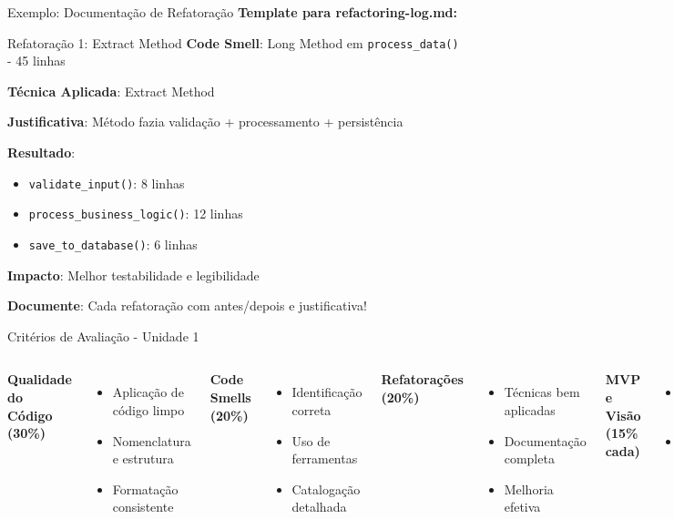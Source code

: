 \documentclass[10pt]{beamer}
\begin{document}
\begin{frame}[fragile]{Exemplo: Documentação de Refatoração}
\textbf{Template para refactoring-log.md:}

\begin{block}{Refatoração 1: Extract Method}
\textbf{Code Smell}: Long Method em \texttt{process\_data()} - 45 linhas

\textbf{Técnica Aplicada}: Extract Method

\textbf{Justificativa}: Método fazia validação + processamento + persistência

\textbf{Resultado}: 
\begin{itemize}
    \item \texttt{validate\_input()}: 8 linhas
    \item \texttt{process\_business\_logic()}: 12 linhas  
    \item \texttt{save\_to\_database()}: 6 linhas
\end{itemize}

\textbf{Impacto}: Melhor testabilidade e legibilidade
\end{block}

\vspace{0.2cm}
\textbf{Documente}: Cada refatoração com antes/depois e justificativa!
\end{frame}

\begin{frame}{Critérios de Avaliação - Unidade 1}
\begin{columns}[t]
\textbf{Qualidade do Código (30\%)}
\begin{itemize}
    \item Aplicação de código limpo
    \item Nomenclatura e estrutura
    \item Formatação consistente
\end{itemize}

\textbf{Code Smells (20\%)}
\begin{itemize}
    \item Identificação correta
    \item Uso de ferramentas
    \item Catalogação detalhada
\end{itemize}

\textbf{Refatorações (20\%)}
\begin{itemize}
    \item Técnicas bem aplicadas
    \item Documentação completa
    \item Melhoria efetiva
\end{itemize}

\textbf{MVP e Visão (15\% cada)}
\begin{itemize}
    \item Funcionalidade e valor
    \item Planejamento coerente
\end{itemize}
\end{columns}
\end{frame}
\end{document}
